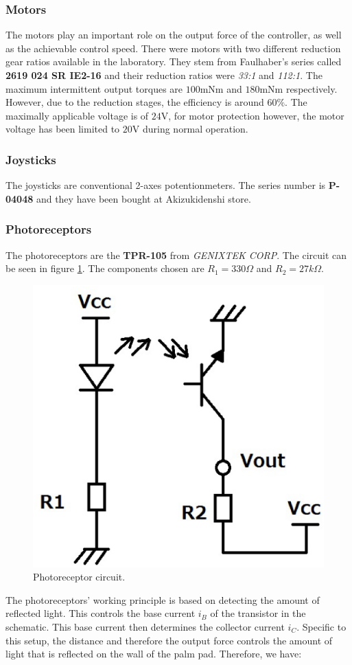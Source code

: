 \subsubsection{Motors}
The motors play an important role on the output force of the controller, as well as the achievable control speed. There were motors with two different reduction gear ratios available in the laboratory. They stem from Faulhaber's series called \textbf{2619 024 SR IE2-16} and their reduction ratios were \textit{33:1} and \textit{112:1}. The maximum intermittent output torques are $100$mNm and $180$mNm respectively. However, due to the reduction stages, the efficiency is around $60\%$. The maximally applicable voltage is of $24$V, for motor protection however, the motor voltage has been limited to $20$V during normal operation.

\subsubsection{Joysticks}
The joysticks are conventional 2-axes potentionmeters. The series number is \textbf{P-04048} and they have been bought at Akizukidenshi store.

\subsubsection{Photoreceptors}
The photoreceptors are the \textbf{TPR-105} from \textit{GENIXTEK CORP}. The circuit can be seen in figure \ref{fig:tpr105_circuit}. The components chosen are $R_1 = 330\Omega$ and $R_2 = 27k\Omega$.
	
\begin{figure}[h!]
	\centering
	\includegraphics[width=0.2\linewidth]{Figs/tpr105_circuit}
	\caption{Photoreceptor circuit.}
	\label{fig:tpr105_circuit}
\end{figure}
The photoreceptors' working principle is based on detecting the amount of reflected light. This controls the base current $i_B$ of the transistor in the schematic. This base current then determines the collector current $i_C$. Specific to this setup, the distance and therefore the output force controls the amount of light that is reflected on the wall of the palm pad. Therefore, we have:

